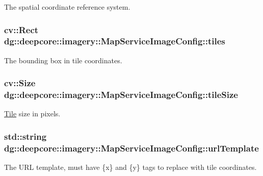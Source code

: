 The spatial coordinate reference system. 

\subsubsection[{\texorpdfstring{tiles}{tiles}}]{\setlength{\rightskip}{0pt plus 5cm}cv\+::\+Rect dg\+::deepcore\+::imagery\+::\+Map\+Service\+Image\+Config\+::tiles}\hypertarget{structdg_1_1deepcore_1_1imagery_1_1_map_service_image_config_ac91d37e373d148439e87b05fbb8d791c}{}\label{structdg_1_1deepcore_1_1imagery_1_1_map_service_image_config_ac91d37e373d148439e87b05fbb8d791c}


The bounding box in tile coordinates. 

\subsubsection[{\texorpdfstring{tile\+Size}{tileSize}}]{\setlength{\rightskip}{0pt plus 5cm}cv\+::\+Size dg\+::deepcore\+::imagery\+::\+Map\+Service\+Image\+Config\+::tile\+Size}\hypertarget{structdg_1_1deepcore_1_1imagery_1_1_map_service_image_config_a4453f79e40168e535ea298d5d3428ec9}{}\label{structdg_1_1deepcore_1_1imagery_1_1_map_service_image_config_a4453f79e40168e535ea298d5d3428ec9}


\hyperlink{structdg_1_1deepcore_1_1imagery_1_1_tile}{Tile} size in pixels. 

\subsubsection[{\texorpdfstring{url\+Template}{urlTemplate}}]{\setlength{\rightskip}{0pt plus 5cm}std\+::string dg\+::deepcore\+::imagery\+::\+Map\+Service\+Image\+Config\+::url\+Template}\hypertarget{structdg_1_1deepcore_1_1imagery_1_1_map_service_image_config_a8187c250438a019d1e5f9f100fd368e7}{}\label{structdg_1_1deepcore_1_1imagery_1_1_map_service_image_config_a8187c250438a019d1e5f9f100fd368e7}


The U\+RL template, must have \{x\} and \{y\} tags to replace with tile coordinates. 

